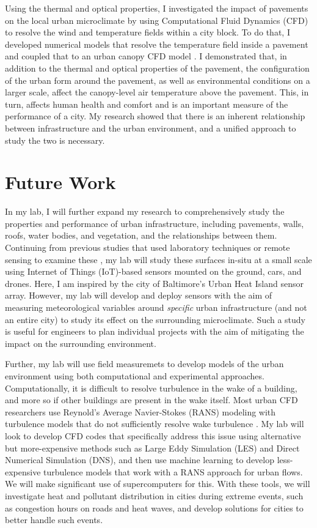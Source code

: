 \documentclass[12pt]{article}
\begin{document}
Using the thermal and optical properties, I investigated the impact of pavements on the local urban microclimate by using Computational Fluid Dynamics (CFD) to resolve the wind and temperature fields within a city block. To do that, I developed numerical models that resolve the temperature field inside a pavement \cite{sen2017microscale} and coupled that to an urban canopy CFD model \cite{sen2017uncoupled}. I demonstrated that, in addition to the thermal and optical properties of the pavement, the configuration of the urban form around the pavement, as well as environmental conditions on a larger scale, affect the canopy-level air temperature above the pavement. This, in turn, affects human health and comfort and is an important measure of the performance of a city. My research showed that there is an inherent relationship between infrastructure and the urban environment, and a unified approach to study the two is necessary.

\section*{Future Work}
In my lab, I will further expand my research to comprehensively study the properties and performance of urban infrastructure, including pavements, walls, roofs, water bodies, and vegetation, and the relationships between them. Continuing from previous studies that used laboratory techniques or remote sensing to examine these \cite{berdahl1997preliminary, niachou2001analysis, sun2012can, gallo1993use}, my lab will study these surfaces in-situ at a small scale using Internet of Things (IoT)-based sensors mounted on the ground, cars, and drones. Here, I am inspired by the city of Baltimore's Urban Heat Island sensor array. However, my lab will develop and deploy sensors with the aim of measuring meteorological variables around \textit{specific} urban infrastructure (and not an entire city) to study its effect on the surrounding microclimate. Such a study is useful for engineers to plan individual projects with the aim of mitigating the impact on the surrounding environment. 

Further, my lab will use field measuremets to develop models of the urban environment using both computational and experimental approaches. Computationally, it is difficult to resolve turbulence in the wake of a building, and more so if other buildings are present in the wake itself. Most urban CFD researchers use Reynold's Average Navier-Stokes (RANS) modeling with turbulence models that do not sufficiently resolve wake turbulence \cite{blocken2015computational}. My lab will look to develop CFD codes that specifically address this issue using alternative but more-expensive methods such as Large Eddy Simulation (LES) and Direct Numerical Simulation (DNS), and then use machine learning to develop less-expensive turbulence models that work with a RANS approach for urban flows. We will make significant use of supercomputers for this. With these tools, we will investigate heat and pollutant distribution in cities during extreme events, such as congestion hours on roads and heat waves, and develop solutions for cities to better handle such events.
\end{document}
